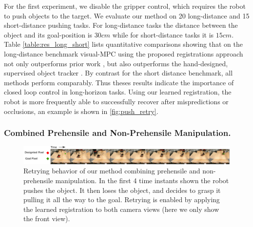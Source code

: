 For the first experiment, we disable the gripper control, which requires the robot to push objects to the target.
We evaluate our method on 20 long-distance and 15 short-distance pushing tasks. For long-distance tasks the distance between the object and its goal-position is $30cm$ while for short-distance tasks it is $15cm$. Table \ref{table:res_long_short} lists quantitative comparisons showing that on the long-distance benchmark visual-MPC using the proposed registrations approach not only outperforms prior work \cite{sna}, but also outperforms the hand-designed, supervised object tracker \cite{babenko2009visual}. By contrast for the short distance benchmark, all methods perform comparably. Thus theses results indicate the importance of closed loop control in long-horizon tasks. Using our learned registration, the robot is more frequently able to successfully recover after mispredictions or occlusions, an example is shown in \autoref{fig:push_retry}.


\subsubsection{Combined Prehensile and Non-Prehensile Manipulation.}
\begin{figure}
	\centering
	\includegraphics[width=1.0\textwidth]{images_rfr/pick_place_plush.pdf}
	\caption{\small{Retrying behavior of our method combining prehensile and non-prehensile manipulation. In the first 4 time instants shown the robot pushes the object. It then loses the object, and decides to grasp it pulling it all the way to the goal. Retrying is enabled by applying the learned registration to both camera views (here we only show the front view).}}
	\label{fig:push_grasp}
	
\end{figure}

